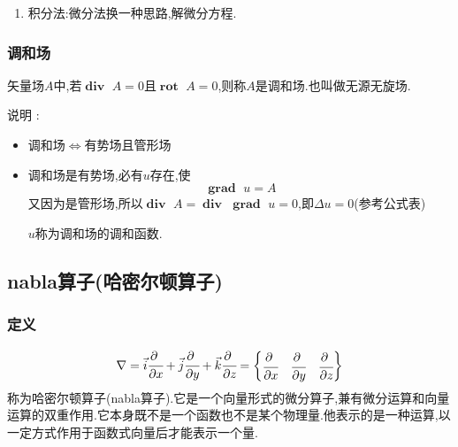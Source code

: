 \documentclass[UTF8,12pt]{ctexbook}
\newcommand{\partialDerivativeFrac}[2]{\cfrac{\partial #1}{\partial #2}}
\DeclareMathOperator{\divergenceText}{\mathbf{div}\ }
\DeclareMathOperator{\curlRotText}{\mathbf{rot}\ }
\DeclareMathOperator{\gradText}{\mathbf{grad}\ }
\begin{document}
{{{{{\begin{enumerate}
{              找一个函数$u(x,y,z)$,使得$$
                du = Pdx + Qdy + Rdz
              $$
              则势函数$v(x,y,z) = -u(x,y,z)$
              }
        \item 积分法:微分法换一种思路,解微分方程.
      \end{enumerate}
    }%

    \subsubsection{调和场}{
      矢量场$A$中,若$\divergenceText A = 0$且$\curlRotText A = 0$,则称$A$是调和场.也叫做无源无旋场.

      说明 :
      \begin{itemize}
        \item 调和场$\Leftrightarrow$有势场且管形场
        \item {
              调和场是有势场,必有$u$存在,使$$
                \gradText u = A
              $$
              又因为是管形场,所以$\divergenceText A = \divergenceText\gradText u = 0$,即$\Delta u = 0$(参考公式表)

              $u$称为调和场的调和函数.
              }
      \end{itemize}
    }%

  }%

  \subsection{nabla算子(哈密尔顿算子)}{

    \subsubsection{定义}{
      $$
        \nabla = \vec{i}\partialDerivativeFrac{\ }{x} + \vec{j}\partialDerivativeFrac{\ }{y} + \vec{k}\partialDerivativeFrac{\ }{z} = \begin{Bmatrix}
          \partialDerivativeFrac{\ }{x} & \partialDerivativeFrac{\ }{y} & \partialDerivativeFrac{\ }{z}
        \end{Bmatrix}
      $$
      称为哈密尔顿算子(nabla算子).它是一个向量形式的微分算子,兼有微分运算和向量运算的双重作用.它本身既不是一个函数也不是某个物理量.他表示的是一种运算,以一定方式作用于函数式向量后才能表示一个量.
    }%

}}}}
\end{document}
